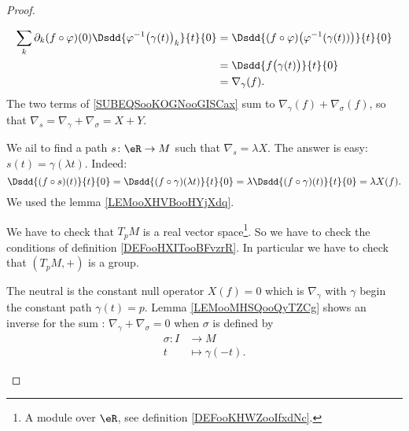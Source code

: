 \begin{proof}
\begin{subproof}
\begin{subequations}
			\begin{align}
				\sum_k\partial_k(f\circ \varphi)(0)\Dsdd{ \varphi^{-1}\big( \gamma(t) \big)_k }{t}{0} & =\Dsdd{ (f\circ\varphi)\big( \varphi^{-1}(\gamma(t)) \big) }{t}{0} \\
				                                                                                      & =\Dsdd{ f\big( \gamma(t) \big) }{t}{0}                             \\
				                                                                                      & =\nabla_{\gamma}(f).
			\end{align}
		\end{subequations}
		The two terms of \eqref{SUBEQSooKOGNooGISCax} sum to \( \nabla_{\gamma}(f)+\nabla_{\sigma}(f)\), so that \( \nabla_s=\nabla_{\gamma}+\nabla_{\sigma}=X+Y\).

		\spitem[Product]

		We ail to find a path \( s\colon \eR\to M\) such that \( \nabla_s=\lambda X\). The answer is easy: \( s(t)=\gamma(\lambda t)\). Indeed:
		\begin{equation}
			\Dsdd{ (f\circ s)(t) }{t}{0}=\Dsdd{ (f\circ \gamma)(\lambda t) }{t}{0}=\lambda \Dsdd{ (f\circ \gamma)(t) }{t}{0}=\lambda X(f).
		\end{equation}
		We used the lemma \ref{LEMooXHVBooHYjXdq}.


		We have to check that \( T_pM\) is a real vector space\footnote{A module over \( \eR\), see definition \ref{DEFooKHWZooIfxdNc}.}. So we have to check the conditions of definition \ref{DEFooHXITooBFvzrR}. In particular we have to check that \( (T_pM,+)\) is a group.

		The neutral is the constant null operator \( X(f)=0\) which is \( \nabla_{\gamma}\) with \( \gamma\) begin the constant path \( \gamma(t)=p\). Lemma \ref{LEMooMHSQooQyTZCg} shows an inverse for the sum : \( \nabla_{\gamma}+\nabla_{\sigma}=0\) when \( \sigma\) is defined by
		\begin{equation}
			\begin{aligned}
				\sigma\colon I & \to M               \\
				t              & \mapsto \gamma(-t).
			\end{aligned}
		\end{equation}

	\end{subproof}
\end{proof}


